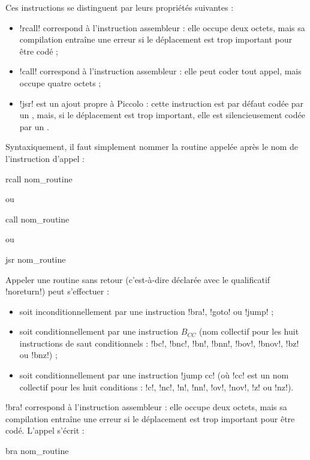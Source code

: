 Ces instructions se distinguent par leurs propriétés suivantes :
\begin{itemize}
  \item \pic!rcall! correspond à l’instruction assembleur  : elle occupe deux octets, mais sa compilation entraîne une erreur si le déplacement est trop important pour être codé ;
  \item \pic!call! correspond à l’instruction assembleur  : elle peut coder tout appel, mais occupe quatre octets ;
  \item \pic!jsr! est un ajout propre à Piccolo : cette instruction est par défaut codée par un , mais, si le déplacement est trop important, elle est silencieusement codée par un .
\end{itemize}

Syntaxiquement, il faut simplement nommer la routine appelée après le nom de l’instruction d’appel :

\begin{piccolo}
rcall nom_routine
\end{piccolo}
ou
\begin{piccolo}
call nom_routine
\end{piccolo}
ou
\begin{piccolo}
jsr nom_routine
\end{piccolo}





Appeler une routine sans retour (c'est-à-dire déclarée avec le qualificatif \pic!noreturn!) peut s'effectuer :
\begin{itemize}
  \item soit inconditionnellement par une instruction  \pic!bra!, \pic!goto! ou \pic!jump! ;
  \item soit conditionnellement par une instruction $B_{CC}$ (nom collectif pour les huit instructions de saut conditionnels : \pic!bc!, \pic!bnc!, \pic!bn!, \pic!bnn!, \pic!bov!, \pic!bnov!, \pic!bz! ou \pic!bnz!) ;
  \item soit conditionnellement par une instruction \pic!jump cc! (où \pic!cc! est un nom collectif pour les huit conditions : \pic!c!, \pic!nc!, \pic!n!, \pic!nn!, \pic!ov!, \pic!nov!, \pic!z! ou \pic!nz!).
\end{itemize}



\pic!bra! correspond à l’instruction assembleur  : elle occupe deux octets, mais sa compilation entraîne une erreur si le déplacement est trop important pour être codé. L'appel s'écrit :
\begin{piccolo}
bra nom_routine
\end{piccolo}



